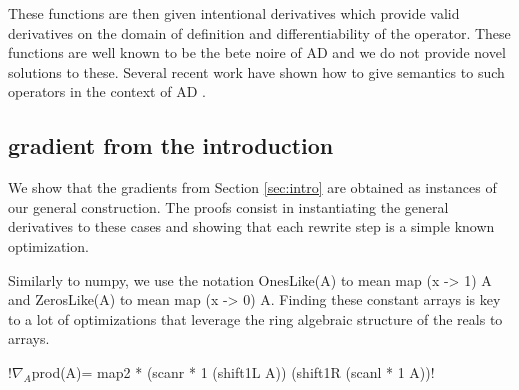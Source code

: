 These functions are then given intentional derivatives which provide valid derivatives 
on the domain of definition and differentiability of the operator. 
These functions are well known to be the bete noire of AD \cite{griewank2008evaluating} 
and we do not provide novel solutions to these.  
Several recent work have shown how to give semantics to such operators in the context of AD \cite{vakar2020denotational,mazza2021automatic,sherman2021,lee2020correctness}.

\subsection{gradient from the introduction}
\label{sub:gradintro}

We show that the gradients from Section \ref{sec:intro} are obtained as instances of our general construction. 
The proofs consist in instantiating the general derivatives to these cases 
and showing that each rewrite step is a simple known optimization.

Similarly to numpy, we use the notation OnesLike(A) to mean map (x -> 1) A 
and ZerosLike(A) to mean map (x -> 0) A. 
Finding these constant arrays is key to a lot of optimizations that leverage the ring algebraic structure of the reals to arrays.

 \begin{lemma}
    !$\nabla_A$prod(A)= map2 * (scanr * 1 (shift1L A)) (shift1R (scanl * 1 A))!
 \end{lemma}

